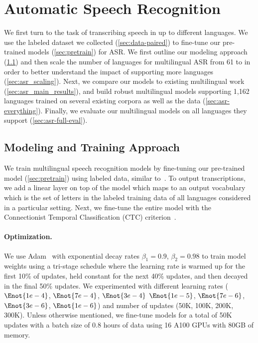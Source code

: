 \section{Automatic Speech Recognition}
\label{sec:asr}

We first turn to the task of transcribing speech in up to \nummmslang{} different languages.
We use the labeled dataset we collected (\textsection\ref{sec:data-paired}) to fine-tune our pre-trained models (\textsection\ref{sec:pretrain}) for ASR.
We first outline our modeling approach (\textsection\ref{sec:asr_modeling}) and then scale the number of languages for multilingual ASR from 61 to \nummmslang{} in order to better understand the impact of supporting more languages (\textsection\ref{sec:asr_scaling}).
Next, we compare our models to existing multilingual work (\textsection\ref{sec:asr_main_results}), and build robust multilingual models supporting 1,162 languages trained on several existing corpora as well as the \MMS{} data (\textsection\ref{sec:asr-everything}).
Finally, we evaluate our multilingual models on all languages they support (\textsection\ref{sec:asr-full-eval}).


\subsection{Modeling and Training Approach}
\label{sec:asr_modeling}

We train multilingual speech recognition models by fine-tuning our pre-trained  model (\textsection\ref{sec:pretrain}) using labeled data, similar to~\citet{baevski2020wav}. 
To output transcriptions, we add a linear layer on top of the model which maps to an output vocabulary which is the set of letters in the labeled training data of all languages considered in a particular setting.
Next, we fine-tune the entire model with the Connectionist Temporal Classification (CTC) criterion~\citep{graves2006ctc}.

\paragraph{Optimization.}
We use Adam~\citep{kingma2015adam} with exponential decay rates $\beta_1=0.9$, $\beta_2=0.98$ to train model weights using a tri-stage schedule where the learning rate is warmed up for the first 10\% of updates, held constant for the next 40\% updates, and then decayed in the final 50\% updates. 
We experimented with different learning rates ($\Enot{1e-4}$, $\Enot{7e-4}$, $\Enot{3e-4}$ $\Enot{1e-5}$, $\Enot{7e-6}$, $\Enot{3e-6}$, $\Enot{1e-6}$) and number of updates (50K, 100K, 200K, 300K).
Unless otherwise mentioned, we fine-tune models for a total of 50K updates with a batch size of 0.8 hours of data using 16 A100 GPUs with 80GB of memory.

